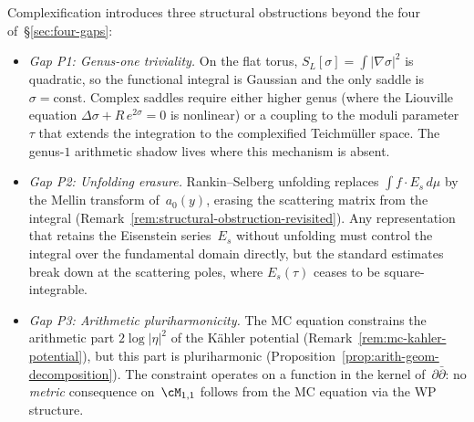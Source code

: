 \begin{remark}%
\label{rem:three-new-gaps}%
%
Complexification introduces three structural obstructions beyond the
four of~\S\ref{sec:four-gaps}:
\begin{itemize}[nosep]
\item \emph{Gap P1: Genus-one triviality.}
 On the flat torus, $S_L[\sigma] = \int\lvert\nabla\sigma
 \rvert^2$ is quadratic, so the functional integral is
 Gaussian and the only saddle is $\sigma = \mathrm{const}$.
 Complex saddles require either higher genus (where the
 Liouville equation
 $\Delta\sigma + R\,e^{2\sigma} = 0$ is nonlinear) or a
 coupling to the moduli parameter~$\tau$ that extends the
 integration to the complexified Teichm\"uller space.
 The genus-$1$ arithmetic shadow lives where this mechanism is absent.

\item \emph{Gap P2: Unfolding erasure.}
 Rankin--Selberg unfolding replaces
 $\int f\cdot E_s\,d\mu$ by the Mellin transform
 of~$a_0(y)$, erasing the scattering matrix from the
 integral
 (Remark~\ref{rem:structural-obstruction-revisited}).
 Any representation that retains the Eisenstein
 series~$E_s$ without unfolding must control the integral
 over the fundamental domain directly, but the standard
 estimates break down at the scattering poles, where
 $E_s(\tau)$ ceases to be square-integrable.

\item \emph{Gap P3: Arithmetic pluriharmonicity.}
 The MC equation constrains the arithmetic part
 $2\log\lvert\eta\rvert^2$ of the K\"ahler potential
 (Remark~\ref{rem:mc-kahler-potential}), but this part is
 pluriharmonic
 (Proposition~\ref{prop:arith-geom-decomposition}).
 The constraint operates on a function in the kernel
 of~$\partial\bar\partial$: no \emph{metric} consequence
 on~$\cM_{1,1}$ follows from the MC equation via the WP
 structure.
\end{itemize}
\end{remark}

